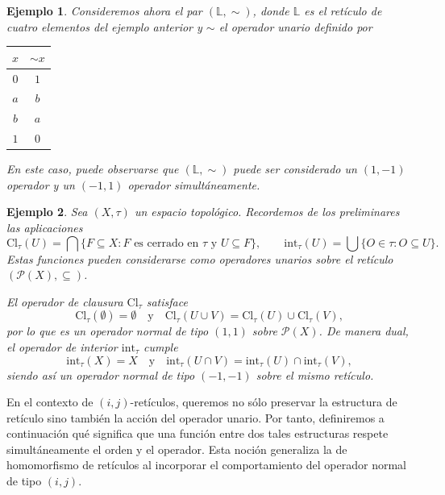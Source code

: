 \documentclass[12pt]{book}
\newtheorem{example}{Ejemplo}
\newcommand{\Cl}{\mathrm{Cl}}
\newcommand{\Int}{\mathrm{int}}
\begin{document}
\begin{example} \label{Ex 2} Consideremos ahora el par $\left(\mathbb{L},\sim\right)$, donde $\mathbb{L}$ es el retículo de cuatro elementos del ejemplo anterior y $\sim$ el operador unario definido por 

\begin{center}
\begin{tabular}{c|c}
$x$  & \( \sim x \)  \tabularnewline 
\hline
$0$  & $1$     \tabularnewline
$a$  & $b$     \tabularnewline
$b$  & $a$     \tabularnewline
$1$  & $0$     \tabularnewline
\end{tabular}
\end{center}
En este caso, puede observarse que $(\mathbb{L},\sim)$ puede ser considerado un $(1,-1)$ operador y un $(-1,1)$ operador simultáneamente.
\end{example}

\begin{example}\label{ex:clausura-interior}
Sea $(X,\tau)$ un espacio topológico. 
Recordemos de los preliminares las aplicaciones
\[
\Cl_{\tau}(U)=\bigcap\{F\subseteq X : F \text{ es cerrado en } \tau \text{ y } U\subseteq F\},
\qquad
\Int_{\tau}(U)=\bigcup\{O\in\tau : O\subseteq U\}.
\]
Estas funciones pueden considerarse como operadores unarios sobre el retículo $(\mathcal{P}(X),\subseteq)$.

El operador de clausura $\Cl_{\tau}$ satisface 
\[
\Cl_{\tau}(\emptyset)=\emptyset
\quad\text{y}\quad
\Cl_{\tau}(U\cup V)=\Cl_{\tau}(U)\cup \Cl_{\tau}(V),
\]
por lo que es un operador normal de tipo $(1,1)$ sobre $\mathcal{P}(X)$.
De manera dual, el operador de interior $\Int_{\tau}$ cumple
\[
\Int_{\tau}(X)=X
\quad\text{y}\quad
\Int_{\tau}(U\cap V)=\Int_{\tau}(U)\cap \Int_{\tau}(V),
\]
siendo así un operador normal de tipo $(-1,-1)$ sobre el mismo retículo.
\end{example}


\medskip
En el contexto de $(i,j)$-retículos, queremos no sólo preservar la estructura de retículo sino también la acción del operador unario.  
Por tanto, definiremos a continuación qué significa que una función entre dos tales estructuras respete simultáneamente el orden y el operador. Esta noción generaliza la de homomorfismo de retículos al incorporar el comportamiento del operador normal de tipo $(i,j)$.
\medskip
\end{document}
